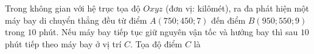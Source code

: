 \begin{ex}
Trong không gian với hệ trục tọa độ $Oxyz$ (đơn vị: kilômét), ra đa phát hiện một máy bay di chuyển thẳng đều từ điểm $A(750;450;7)$ đến điểm $B(950;550;9)$ trong $10$ phút. Nếu máy bay tiếp tục giữ nguyên vận tốc và hướng bay thì sau $10$ phút tiếp theo máy bay ở vị trí $C$. Tọa độ điểm $C$ là
\end{ex}
